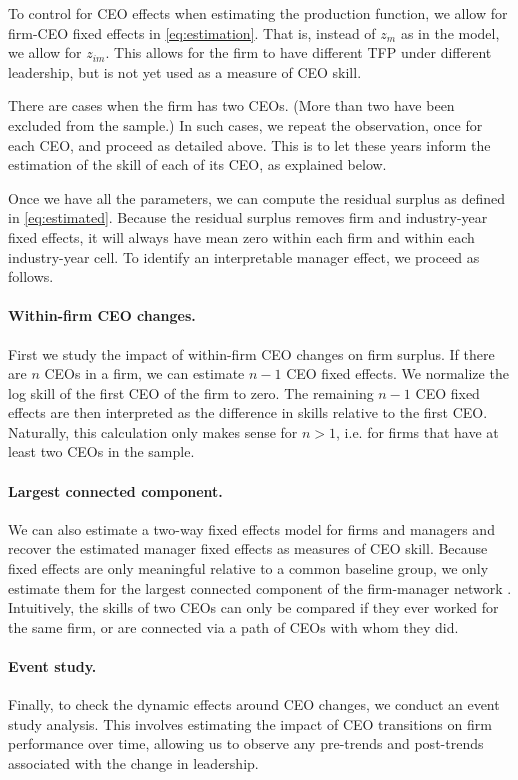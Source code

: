 \documentclass[11pt,a4paper]{article}
\begin{document}
To control for CEO effects when estimating the production function, we allow for firm-CEO fixed effects in \eqref{eq:estimation}. That is, instead of $z_m$ as in the model, we allow for $z_{im}$. This allows for the firm to have different TFP under different leadership, but is not yet used as a measure of CEO skill. 

There are cases when the firm has two CEOs. (More than two have been excluded from the sample.) In such cases, we repeat the observation, once for each CEO, and proceed as detailed above. This is to let these years inform the estimation of the skill of each of its CEO, as explained below.

Once we have all the parameters, we can compute the residual surplus as defined in \eqref{eq:estimated}. Because the residual surplus removes firm and industry-year fixed effects, it will always have mean zero within each firm and within each industry-year cell. To identify an interpretable manager effect, we proceed as follows.

\paragraph{Within-firm CEO changes.}
First we study the impact of within-firm CEO changes on firm surplus. If there are $n$ CEOs in a firm, we can estimate $n-1$ CEO fixed effects. We normalize the log skill of the first CEO of the firm to zero. The remaining $n-1$ CEO fixed effects are then interpreted as the difference in skills relative to the first CEO. Naturally, this calculation only makes sense for $n>1$, i.e. for firms that have at least two CEOs in the sample.

\paragraph{Largest connected component.}
We can also estimate a two-way fixed effects model for firms and managers \citep{Abowd1999-ua,Card2004-ua,reghdfe} and recover the estimated manager fixed effects as measures of CEO skill. Because fixed effects are only meaningful relative to a common baseline group, we only estimate them for the largest connected component of the firm-manager network \citep{Bonhomme2023-dx}. Intuitively, the skills of two CEOs can only be compared if they ever worked for the same firm, or are connected via a path of CEOs with whom they did.

\paragraph{Event study.}
Finally, to check the dynamic effects around CEO changes, we conduct an event study analysis. This involves estimating the impact of CEO transitions on firm performance over time, allowing us to observe any pre-trends and post-trends associated with the change in leadership. 
\end{document}

